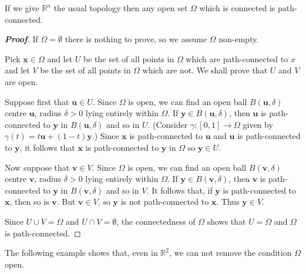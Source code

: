 \begin{theorem}\label{T;connected to path}
If we give ${\mathbb R}^{n}$ the usual topology
then any open set $\Omega$ which is connected is path-connected.
\end{theorem}
\begin{proof}[\bf Proof]
If $\Omega=\emptyset$ there is nothing to prove,
so we assume $\Omega$ non-empty.

Pick ${\mathbf x}\in\Omega$ and let $U$ be the set of all points
in $\Omega$ which are path-connected to $x$ and let $V$ be the set
of all points in $\Omega$ which are not.
We shall prove
that $U$ and $V$ are open.

Suppose first that ${\mathbf u}\in U$. Since $\Omega$
is open, we can find an open ball $B({\mathbf u},\delta)$
centre ${\mathbf u}$, radius $\delta>0$ lying entirely within
$\Omega$. If ${\mathbf y}\in B({\mathbf u},\delta)$,
then ${\mathbf u}$ is path-connected to ${\mathbf y}$ in
$B({\mathbf u},\delta)$ and so in $U$.
(Consider $\gamma:[0,1]\rightarrow\Omega$ given by
$\gamma(t)=t{\mathbf u}+(1-t){\mathbf y}$.)
Since ${\mathbf x}$ is path-connected to ${\mathbf u}$
and
${\mathbf u}$ is path-connected to ${\mathbf y}$,
it follows that
${\mathbf x}$ is path-connected to ${\mathbf y}$
in $\Omega$ so ${\mathbf y}\in U$.

Now suppose that ${\mathbf v}\in V$. Since $\Omega$
is open, we can find an open ball $B({\mathbf v},\delta)$
centre ${\mathbf v}$, radius $\delta>0$ lying entirely within
$\Omega$. If ${\mathbf y}\in B({\mathbf v},\delta)$,
then ${\mathbf v}$ is path-connected to ${\mathbf y}$ in
$B({\mathbf v},\delta)$ and so in $V$. It follows that,
if ${\mathbf y}$ is path-connected to ${\mathbf x}$,
then so is  ${\mathbf v}$. But ${\mathbf v}\in V$,
so ${\mathbf y}$ is not path-connected to ${\mathbf x}$.
Thus ${\mathbf y}\in V$.

Since $U\cup V=\Omega$ and $U\cap V=\emptyset$, the connectedness
of $\Omega$ shows that $U=\Omega$ and $\Omega$ is path-connected.
\end{proof}



The following example shows that, even in ${\mathbb R}^{2}$,
we can not remove the condition $\Omega$ open.



